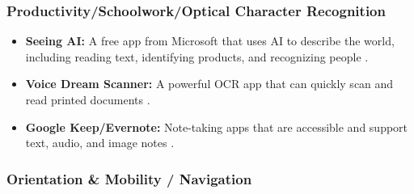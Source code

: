 \subsubsection{Productivity/Schoolwork/Optical Character Recognition}\label{ch2:sssec:ocr-apps}
\begin{itemize}
	\item \textbf{Seeing AI:} A free app from Microsoft that uses AI to describe the world, including reading text, identifying products, and recognizing people \supercite{SeeingAI}.
	\item \textbf{Voice Dream Scanner:} A powerful OCR app that can quickly scan and read printed documents \supercite{VoiceDreamScanner}.
	\item \textbf{Google Keep/Evernote:} Note-taking apps that are accessible and support text, audio, and image notes \supercite{GoogleKeep}.
\end{itemize}

\subsubsection{Orientation \& Mobility / Navigation}

